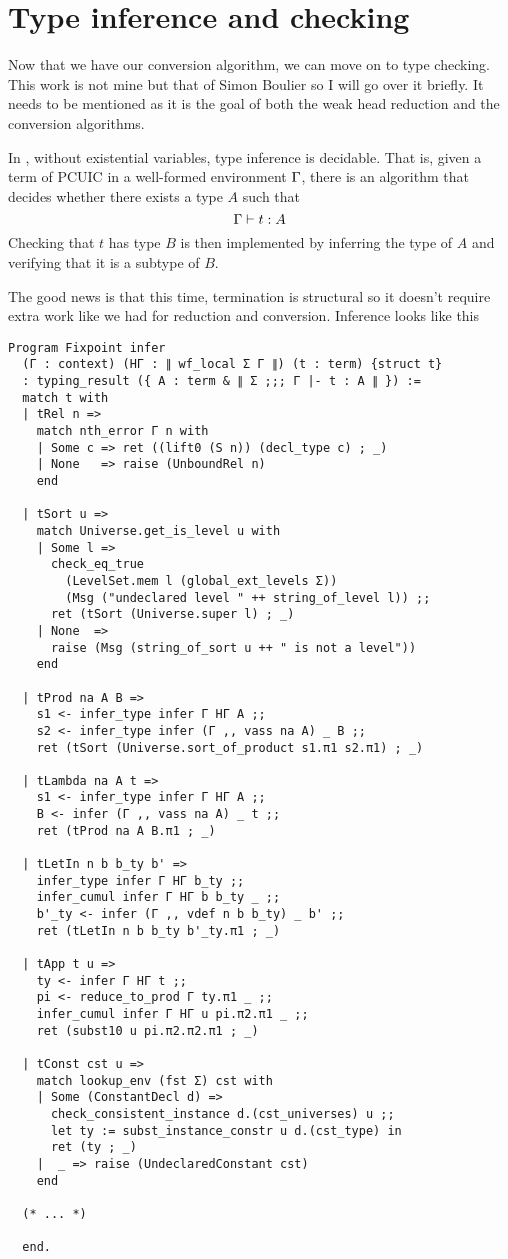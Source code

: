 \chapter{Type inference and checking}

Now that we have our conversion algorithm, we can move on to type checking.
This work is not mine but that of Simon Boulier so I will go over it briefly.
It needs to be mentioned as it is the goal of both the weak head reduction
and the conversion algorithms.

In \Coq, without existential variables, type inference is decidable. That is,
given a term of \acrshort{PCUIC} in a well-formed environment \(\Gamma\), there is
an algorithm that decides whether there exists a type \(A\) such that
\[
  \Gamma \vdash t : A
\]
%
Checking that \(t\) has type \(B\) is then implemented by inferring the type of
\(A\) and verifying that it is a subtype of \(B\).

The good news is that this time, termination is structural so it doesn't require
extra work like we had for reduction and conversion.
Inference looks like this
\begin{verbatim}
Program Fixpoint infer
  (Γ : context) (HΓ : ∥ wf_local Σ Γ ∥) (t : term) {struct t}
  : typing_result ({ A : term & ∥ Σ ;;; Γ |- t : A ∥ }) :=
  match t with
  | tRel n =>
    match nth_error Γ n with
    | Some c => ret ((lift0 (S n)) (decl_type c) ; _)
    | None   => raise (UnboundRel n)
    end

  | tSort u =>
    match Universe.get_is_level u with
    | Some l =>
      check_eq_true
        (LevelSet.mem l (global_ext_levels Σ))
        (Msg ("undeclared level " ++ string_of_level l)) ;;
      ret (tSort (Universe.super l) ; _)
    | None  =>
      raise (Msg (string_of_sort u ++ " is not a level"))
    end

  | tProd na A B =>
    s1 <- infer_type infer Γ HΓ A ;;
    s2 <- infer_type infer (Γ ,, vass na A) _ B ;;
    ret (tSort (Universe.sort_of_product s1.π1 s2.π1) ; _)

  | tLambda na A t =>
    s1 <- infer_type infer Γ HΓ A ;;
    B <- infer (Γ ,, vass na A) _ t ;;
    ret (tProd na A B.π1 ; _)

  | tLetIn n b b_ty b' =>
    infer_type infer Γ HΓ b_ty ;;
    infer_cumul infer Γ HΓ b b_ty _ ;;
    b'_ty <- infer (Γ ,, vdef n b b_ty) _ b' ;;
    ret (tLetIn n b b_ty b'_ty.π1 ; _)

  | tApp t u =>
    ty <- infer Γ HΓ t ;;
    pi <- reduce_to_prod Γ ty.π1 _ ;;
    infer_cumul infer Γ HΓ u pi.π2.π1 _ ;;
    ret (subst10 u pi.π2.π2.π1 ; _)

  | tConst cst u =>
    match lookup_env (fst Σ) cst with
    | Some (ConstantDecl d) =>
      check_consistent_instance d.(cst_universes) u ;;
      let ty := subst_instance_constr u d.(cst_type) in
      ret (ty ; _)
    |  _ => raise (UndeclaredConstant cst)
    end

  (* ... *)

  end.
\end{verbatim}

